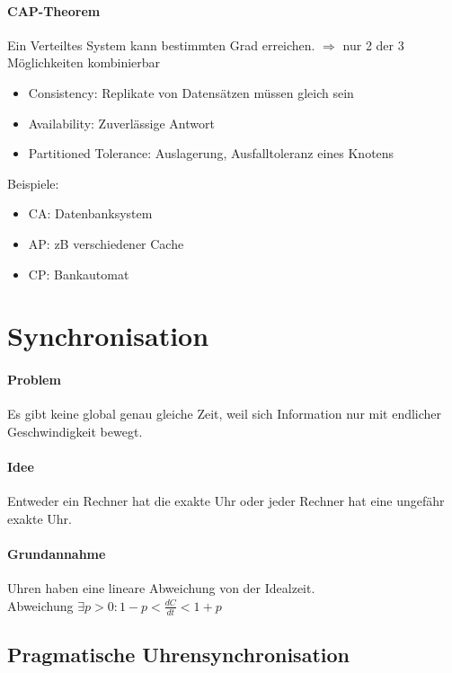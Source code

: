 \documentclass{scrartcl}
\begin{document}
\paragraph{CAP-Theorem} Ein Verteiltes System kann bestimmten Grad erreichen. $\Rightarrow$ nur 2 der 3 Möglichkeiten kombinierbar
\begin{itemize}
\item Consistency: Replikate von Datensätzen müssen gleich sein
\item Availability: Zuverlässige Antwort
\item Partitioned Tolerance: Auslagerung, Ausfalltoleranz eines Knotens
\end{itemize}
Beispiele:
\begin{itemize}
\item CA: Datenbanksystem
\item AP: zB verschiedener Cache
\item CP: Bankautomat
\end{itemize}


%
%

\section{Synchronisation}

\paragraph{Problem} Es gibt keine global genau gleiche Zeit, weil sich Information nur mit endlicher Geschwindigkeit bewegt.
\paragraph{Idee} Entweder ein Rechner hat die exakte Uhr oder jeder Rechner hat eine ungefähr exakte Uhr. 
\paragraph{Grundannahme} Uhren haben eine lineare Abweichung von der Idealzeit.\\
 Abweichung $\exists p > 0: 1-p < \frac{dC}{dt}<1+p $



\subsection{Pragmatische Uhrensynchronisation}
\end{document}
